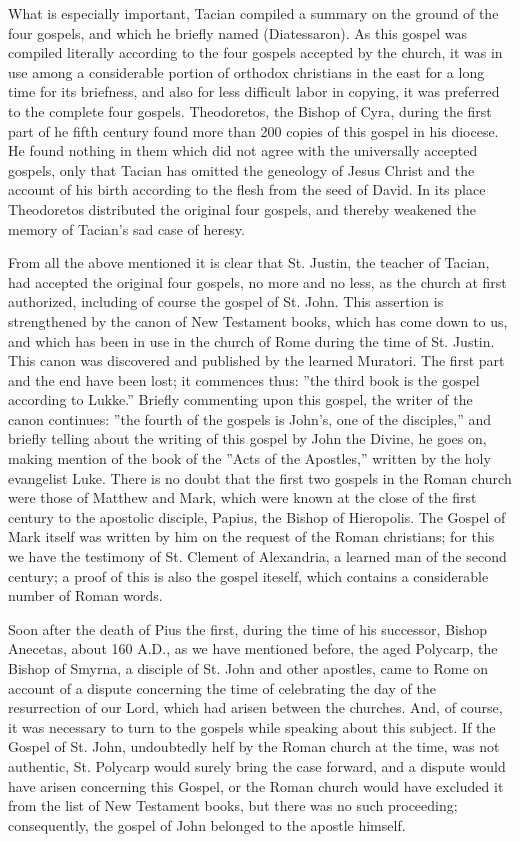 What is especially important, Tacian compiled a summary on the ground of the four gospels, and which he briefly named  (Diatessaron). As this gospel was compiled literally according to the four gospels accepted by the church, it was in use among a considerable portion of orthodox christians in the east for a long time for its briefness, and also for less difficult labor in copying, it was preferred to the complete four gospels. Theodoretos, the Bishop of Cyra, during the first part of he fifth century found more than 200 copies of this gospel in his diocese. He found nothing in them which did not agree with the universally accepted gospels, only that Tacian has omitted the geneology of Jesus Christ and the account of his birth according to the flesh from the seed of David. In its place Theodoretos distributed the original four gospels, and thereby weakened the memory of Tacian's sad case of heresy.

From all the above mentioned it is clear that St. Justin, the teacher of Tacian, had accepted the original four gospels, no more and no less, as the church at first authorized, including of course the gospel of St. John. This assertion is strengthened by the canon of New Testament books, which has come down to us, and which has been in use in the church of Rome during the time of St. Justin. This canon was discovered and published by the learned Muratori. The first part and the end have been lost; it commences thus: ''the third book is the gospel according to Lukke.'' Briefly commenting upon this gospel, the writer of the canon continues: ''the fourth of the gospels is John's, one of the disciples,'' and briefly telling about the writing of this gospel by John the Divine, he goes on, making mention of the book of the ''Acts of the Apostles,'' written by the holy evangelist Luke. There is no doubt that the first two gospels in the Roman church were those of Matthew and Mark, which were known at the close of the first century to the apostolic disciple, Papius, the Bishop of Hieropolis. The Gospel of Mark itself was written by him on the request of the Roman christians; for this we have the testimony of St. Clement of Alexandria, a learned man of the second century; a proof of this is also the gospel iteself, which contains a considerable number of Roman words.

Soon after the death of Pius the first, during the time of his successor, Bishop Anecetas, about 160 A.D., as we have mentioned before, the aged Polycarp, the Bishop of Smyrna, a disciple of St. John and other apostles, came to Rome on account of a dispute concerning the time of celebrating the day of the resurrection of our Lord, which had arisen between the churches. And, of course, it was necessary to turn to the gospels while speaking about this subject. If the Gospel of St. John, undoubtedly helf by the Roman church at the time, was not authentic, St. Polycarp would surely bring the case forward, and a dispute would have arisen concerning this Gospel, or the Roman church would have excluded it from the list of New Testament books, but there was no such proceeding; consequently, the gospel of John belonged to the apostle himself.

